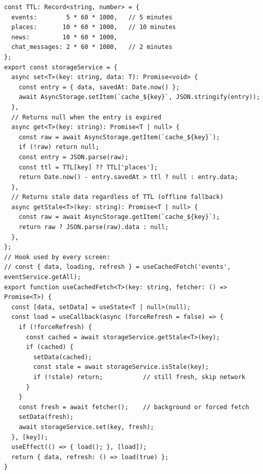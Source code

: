\documentclass[12pt,a4paper]{article}
\begin{document}
\begin{lstlisting}[caption={storageService.ts -- TTL cache, stale-while-revalidate, and offline fallback}]
const TTL: Record<string, number> = {
  events:        5 * 60 * 1000,   // 5 minutes
  places:       10 * 60 * 1000,   // 10 minutes
  news:         10 * 60 * 1000,
  chat_messages: 2 * 60 * 1000,   // 2 minutes
};
export const storageService = {
  async set<T>(key: string, data: T): Promise<void> {
    const entry = { data, savedAt: Date.now() };
    await AsyncStorage.setItem(`cache_${key}`, JSON.stringify(entry));
  },
  // Returns null when the entry is expired
  async get<T>(key: string): Promise<T | null> {
    const raw = await AsyncStorage.getItem(`cache_${key}`);
    if (!raw) return null;
    const entry = JSON.parse(raw);
    const ttl = TTL[key] ?? TTL['places'];
    return Date.now() - entry.savedAt > ttl ? null : entry.data;
  },
  // Returns stale data regardless of TTL (offline fallback)
  async getStale<T>(key: string): Promise<T | null> {
    const raw = await AsyncStorage.getItem(`cache_${key}`);
    return raw ? JSON.parse(raw).data : null;
  },
};
// Hook used by every screen:
// const { data, loading, refresh } = useCachedFetch('events', eventService.getAll);
export function useCachedFetch<T>(key: string, fetcher: () => Promise<T>) {
  const [data, setData] = useState<T | null>(null);
  const load = useCallback(async (forceRefresh = false) => {
    if (!forceRefresh) {
      const cached = await storageService.getStale<T>(key);
      if (cached) {
        setData(cached);
        const stale = await storageService.isStale(key);
        if (!stale) return;           // still fresh, skip network
      }
    }
    const fresh = await fetcher();    // background or forced fetch
    setData(fresh);
    await storageService.set(key, fresh);
  }, [key]);
  useEffect(() => { load(); }, [load]);
  return { data, refresh: () => load(true) };
}
\end{lstlisting}
\end{document}
